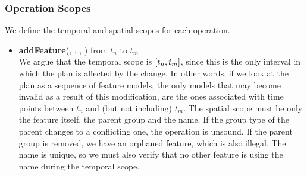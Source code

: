 \subsubsection*{Operation Scopes}
We define the temporal and spatial scopes for each operation.
\begin{itemize}

  \item \textbf{addFeature}(, , , ) from $t_n$ to $t_m$\\
     We argue that the temporal scope is $\interval{t_n}{t_m}$, since this is the only interval in which the plan is affected by the change. In other words, if we look at the plan as a sequence of feature models, the only models that may become invalid as a result of this modification, are the ones associated with time points between $t_n$ and (but not including) $t_m$. The spatial scope must be only the feature itself, the parent group and the name. If the group type of the parent changes to a conflicting one, the operation is unsound. If the parent group is removed, we have an orphaned feature, which is also illegal. The name is unique, so we must also verify that no other feature is using the name during the temporal scope. 
 


\end{itemize}
